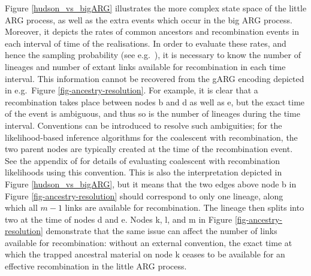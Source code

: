 \documentclass{article}
\begin{document}
Figure \ref{hudson_vs_bigARG} illustrates the more complex state space
of the little ARG process, as well as the extra events which occur in the big ARG process.
Moreover, it depicts the rates of common ancestors and recombination events in each
interval of time of the realisations.
In order to evaluate these rates, and hence the sampling probability
(see e.g.\ \cite[Equation (3)]{mahmoudi2022bayesian}),
it is necessary to know the number of lineages and number of extant links
available for recombination in each time interval.
This information cannot be recovered from the gARG encoding depicted in
e.g.\ Figure \ref{fig-ancestry-resolution}.
For example, it is clear that a recombination takes place between nodes \textsf{b} and
\textsf{d} as well as \textsf{e}, but the exact time of the event is ambiguous,
and thus so is the number of lineages during the time interval.
Conventions can be introduced to resolve such ambiguities;
for the likelihood-based inference algorithms for the coalescent with recombination,
the two parent nodes are typically created at the time of the recombination event.
See the appendix of \cite{baumdicker2021efficient} for details of evaluating
coalescent with recombination likelihoods using this convention.
This is also the interpretation depicted in
Figure \ref{hudson_vs_bigARG}, but it means that the two edges above node \textsf{b}
in Figure \ref{fig-ancestry-resolution} should correspond to only one lineage,
along which all $m-1$ links are available for recombination.
The lineage then splits into two at the time of nodes \textsf{d} and \textsf{e}.
Nodes \textsf{k}, \textsf{l}, and \textsf{m} in Figure \ref{fig-ancestry-resolution}
demonstrate that the same issue can affect the number of links available for recombination:
without an external convention, the exact time at which the trapped ancestral material on
node \textsf{k} ceases to be available for an effective recombination in the little ARG process.
\end{document}
